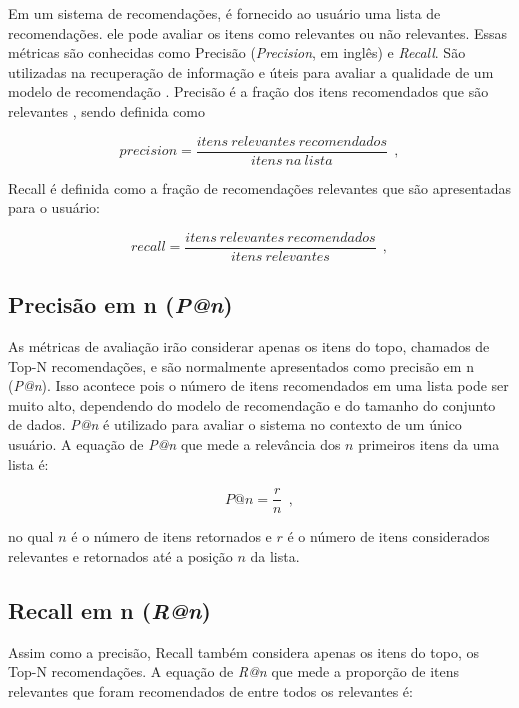 Em um sistema de recomendações, é fornecido ao usuário uma lista de recomendações. ele pode avaliar os itens como relevantes ou não relevantes. Essas métricas são conhecidas como Precisão (\textit{Precision}, em inglês) e \textit{Recall}. São utilizadas na recuperação de informação e úteis para avaliar a qualidade de um modelo de recomendação \citep{ParraSahebi2013}. Precisão é a fração dos itens recomendados que são relevantes \citep{Manning:2008:IIR:1394399}, sendo definida como

\begin{equation}
    precision = \frac{itens~relevantes~recomendados}{itens~na~lista}~~,
\end{equation}

Recall é definida como a fração de recomendações relevantes que são apresentadas para o usuário:

\begin{equation}
    recall = \frac{itens~relevantes~recomendados}{itens~relevantes}~~,
\end{equation}

\subsection{Precisão em n (\textit{P@n})}

As métricas de avaliação irão considerar apenas os itens do topo, chamados de Top-N recomendações, e são normalmente apresentados como precisão em n (\textit{P@n}). Isso acontece pois o número de itens recomendados em uma lista pode ser muito alto, dependendo do modelo de recomendação e do tamanho do conjunto de dados. \textit{P@n} é utilizado para avaliar o sistema no contexto de um único usuário. A equação de \textit{P@n} que mede a relevância dos $n$ primeiros itens da uma lista é:

\begin{equation}
    P@n = \frac{r}{n}~~,
\end{equation}

no qual $n$ é o número de itens retornados e $r$ é o número de itens considerados relevantes e retornados até a posição $n$ da lista.

\subsection{Recall em n (\textit{R@n})}

Assim como a precisão, Recall também considera apenas os itens do topo, os Top-N recomendações. A equação de \textit{R@n} que mede a proporção de itens relevantes que foram recomendados de entre todos os relevantes é:

